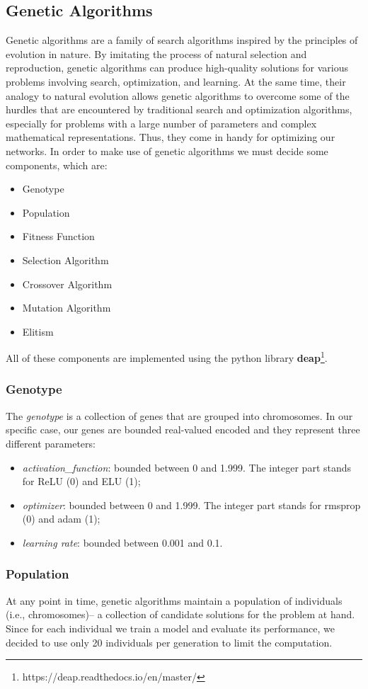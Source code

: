 \subsection{Genetic Algorithms}
Genetic algorithms are a family of search algorithms inspired by the principles of evolution in nature. By imitating the process of natural selection and reproduction, genetic algorithms can produce high-quality solutions for various problems involving search, optimization, and learning. At the same time, their analogy to natural evolution allows genetic algorithms to overcome some of the hurdles that are encountered by traditional search and optimization algorithms, especially for problems with a large number of parameters and complex mathematical representations. Thus, they come in handy for optimizing our networks.
In order to make use of genetic algorithms we must decide some components, which are:
\begin{itemize}
\item Genotype
\item Population
\item Fitness Function
\item Selection Algorithm
\item Crossover Algorithm
\item Mutation Algorithm
\item Elitism
\end{itemize}
All of these components are implemented using the python library \textbf{deap}\footnote{https://deap.readthedocs.io/en/master/}.

\subsubsection{Genotype}
The \textit{genotype} is a collection of genes that are grouped into chromosomes. In our specific case, our genes are bounded real-valued encoded and they represent three different parameters:
\begin{itemize}
\item \textit{activation\_function}: bounded between 0 and 1.999. The integer part stands for ReLU (0) and ELU (1);
\item \textit{optimizer}: bounded between 0 and 1.999. The integer part stands for rmsprop (0) and adam (1);
\item \textit{learning rate}: bounded between 0.001 and 0.1.
\end{itemize}

\subsubsection{Population}
At any point in time, genetic algorithms maintain a population of individuals (i.e., chromosomes)– a collection of candidate solutions for the problem at hand. Since for each individual we train a model and evaluate its performance, we decided to use only 20 individuals per generation to limit the computation.


